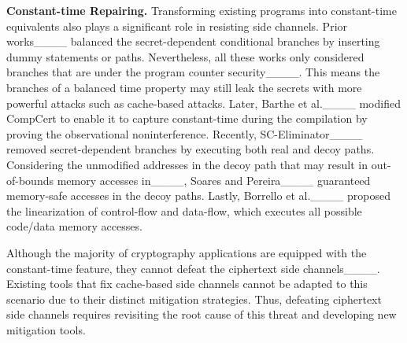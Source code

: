 \noindent \textbf{Constant-time Repairing.}
Transforming existing programs into constant-time equivalents also plays a significant role in resisting side
channels. 
Prior works____ balanced the secret-dependent conditional branches by inserting dummy statements or paths.
Nevertheless, all these works only considered branches that are under the program counter security____.
This means the branches of a balanced time property may still leak the secrets with more powerful attacks such as
cache-based attacks. 
Later, Barthe et al.____ modified CompCert to enable it to capture constant-time during the compilation by proving the observational noninterference. 
Recently, SC-Eliminator____ removed secret-dependent branches by executing both real and decoy paths. 
Considering the unmodified addresses in the decoy path that may result in out-of-bounds memory accesses in____, Soares and Pereira____ guaranteed memory-safe accesses in the decoy paths. 
Lastly, Borrello et al.____ proposed the linearization of control-flow and data-flow, which executes all possible code/data memory accesses.

Although the majority of cryptography applications are equipped with the constant-time feature, they cannot defeat the ciphertext side channels____.
Existing tools that fix cache-based side channels cannot be adapted to this scenario due to their distinct mitigation strategies.
Thus, defeating ciphertext side channels requires revisiting the root cause of this threat and developing new mitigation tools.